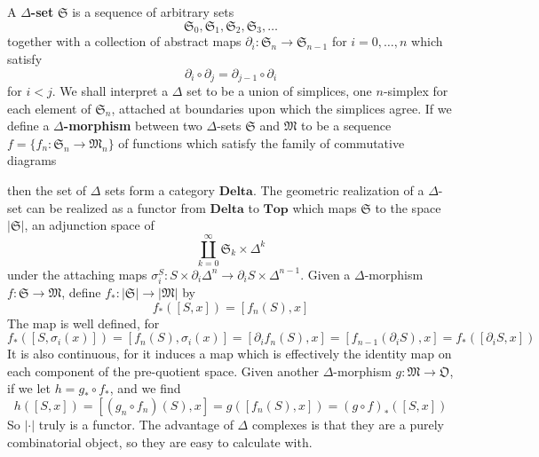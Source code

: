 A {\bf $\Delta$-set} $\mathfrak{S}$ is a sequence of arbitrary sets
%
\[ \mathfrak{S}_0, \mathfrak{S}_1, \mathfrak{S}_2, \mathfrak{S}_3, \dots \]
%
together with a collection of abstract maps $\partial_i : \mathfrak{S}_n \to \mathfrak{S}_{n-1}$ for $i = 0, \dots, n$ which satisfy
%
\[ \partial_i \circ \partial_j = \partial_{j-1} \circ \partial_i \]
%
for $i < j$. We shall interpret a $\Delta$ set to be a union of simplices, one $n$-simplex for each element of $\mathfrak{S}_n$, attached at boundaries upon which the simplices agree. If we define a {\bf $\Delta$-morphism} between two $\Delta$-sets $\mathfrak{S}$ and $\mathfrak{M}$ to be a sequence $f = \{ f_n: \mathfrak{S}_n \to \mathfrak{M}_n \}$ of functions which satisfy the family of commutative diagrams
%
\begin{center}
\end{center}
%
then the set of $\Delta$ sets form a category $\textbf{Delta}$. The geometric realization of a $\Delta$-set can be realized as a functor from $\textbf{Delta}$ to $\textbf{Top}$ which maps $\mathfrak{S}$ to the space $|\mathfrak{S}|$, an adjunction space of
%
\[ \coprod_{k = 0}^\infty \mathfrak{S}_k \times \Delta^k \]
%
under the attaching maps $\sigma^S_i: S \times \partial_i \Delta^n \to \partial_i S \times \Delta^{n-1}$. Given a $\Delta$-morphism $f: \mathfrak{S} \to \mathfrak{M}$, define $f_*: |\mathfrak{S}| \to |\mathfrak{M}|$ by
%
\[ f_*([S,x]) = [f_n(S),x] \]
%
The map is well defined, for
%
\[ f_*([S,\sigma_i(x)]) = [f_n(S),\sigma_i(x)] = [\partial_i f_n( S ), x] = [f_{n-1}(\partial_i S), x] = f_*([\partial_i S, x]) \]
%
It is also continuous, for it induces a map which is effectively the identity map on each component of the pre-quotient space. Given another $\Delta$-morphism $g: \mathfrak{M} \to \mathfrak{O}$, if we let $h = g_* \circ f_*$, and we find
%
\[ h([S,x]) = [(g_n \circ f_n)(S), x] = g([f_n(S), x]) = (g \circ f)_*([S,x]) \]
%
So $| \cdot |$ truly is a functor. The advantage of $\Delta$ complexes is that they are a purely combinatorial object, so they are easy to calculate with.

